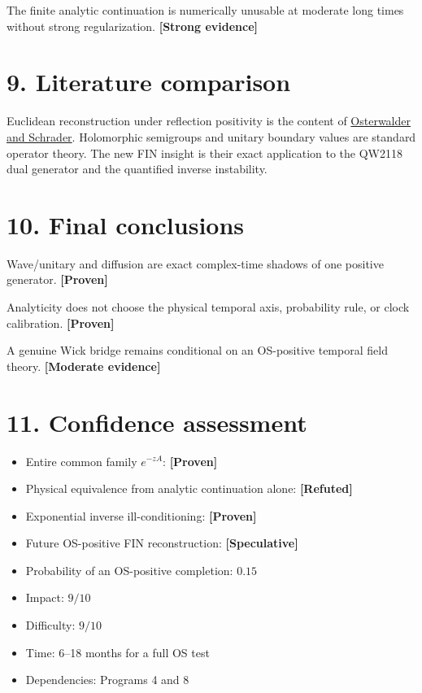 \documentclass[11pt,a4paper,openany]{report}
\newcommand{\statusProven}{\textcolor{fingreen}{[Proven]}}
\newcommand{\statusStrong}{\textcolor{finblue}{[Strong evidence]}}
\newcommand{\statusModerate}{\textcolor{finviolet}{[Moderate evidence]}}
\newcommand{\statusSpeculative}{\textcolor{finorange}{[Speculative]}}
\newcommand{\statusRefuted}{\textcolor{finred}{[Refuted]}}
\begin{document}
The finite analytic continuation is numerically unusable at moderate long times without strong regularization. \textbf{\statusStrong{}}

\section{9. Literature comparison}

Euclidean reconstruction under reflection positivity is the content of \href{https://doi.org/10.1007/BF01645738}{Osterwalder and Schrader}. Holomorphic semigroups and unitary boundary values are standard operator theory. The new FIN insight is their exact application to the QW2118 dual generator and the quantified inverse instability.

\section{10. Final conclusions}

Wave/\allowbreak{}unitary and diffusion are exact complex-time shadows of one positive generator. \textbf{\statusProven{}}

Analyticity does not choose the physical temporal axis, probability rule, or clock calibration. \textbf{\statusProven{}}

A genuine Wick bridge remains conditional on an OS-positive temporal field theory. \textbf{\statusModerate{}}

\section{11. Confidence assessment}

\begin{itemize}
\item 
Entire common family \(e^{-zA}\): \textbf{\statusProven{}}

\item 
Physical equivalence from analytic continuation alone: \textbf{\statusRefuted{}}

\item 
Exponential inverse ill-conditioning: \textbf{\statusProven{}}

\item 
Future OS-positive FIN reconstruction: \textbf{\statusSpeculative{}}

\item 
Probability of an OS-positive completion: \(0.15\)

\item 
Impact: \(9/10\)

\item 
Difficulty: \(9/10\)

\item 
Time: 6–18 months for a full OS test

\item 
Dependencies: Programs 4 and 8

\end{itemize}
\end{document}
